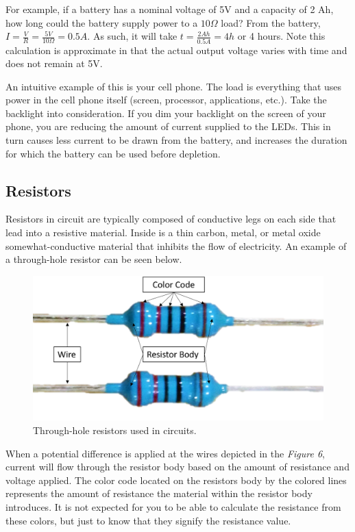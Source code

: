 \documentclass[12pt]{article}
\begin{document}
For example, if a battery has a nominal voltage of 5V and a capacity of 2 Ah, how long could the battery supply power to a $10\Omega$ load? From the battery, $I = \frac{V}{R} = \frac{5V}{10\Omega} = 0.5 A$. As such, it will take $t = \frac{2Ah}{0.5A} = 4h$ or 4 hours. Note this calculation is approximate in that the actual output voltage varies with time and does not remain at 5V.

An intuitive example of this is your cell phone. The load is everything that uses power in the cell phone itself (screen, processor, applications, etc.). Take the backlight into consideration. If you dim your backlight on the screen of your phone, you are reducing the amount of current supplied to the LEDs. This in turn causes less current to be drawn from the battery, and increases the duration for which the battery can be used before depletion.  

\subsection{Resistors}

Resistors in circuit are typically composed of conductive legs on each side that lead into a resistive material. Inside is a thin carbon, metal, or metal oxide somewhat-conductive material that inhibits the flow of electricity. An example of a through-hole resistor can be seen below.  

\begin{figure}[H]
    \centering
    \includegraphics[width=15cm]{photos/prelim/resistors.png}
    \caption{Through-hole resistors used in circuits.}
\end{figure}

When a potential difference is applied at the wires depicted in the \textit{Figure 6}, current will flow through the resistor body based on the amount of resistance and voltage applied. The color code located on the resistors body by the colored lines represents the amount of resistance the material within the resistor body introduces. It is not expected for you to be able to calculate the resistance from these colors, but just to know that they signify the resistance value. 
\end{document}
